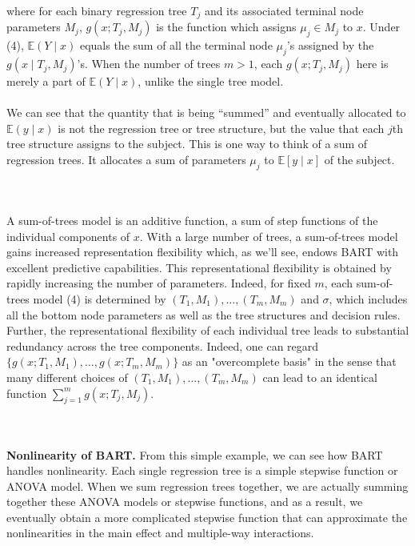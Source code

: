 \documentclass[a4paper,11pt]{article}
\begin{document}
where for each binary regression tree \( T_j \) and its associated terminal node parameters \( M_j \), \( g(x; T_j, M_j) \) is the function which assigns \( \mu_{j} \in M_j \) to \( x \). Under (4), \( \mathbb{E}(Y \mid x) \) equals the sum of all the terminal node \( \mu_{j} \)'s assigned by the \( g(x \mid T_j, M_j) \)'s. When the number of trees \( m > 1 \), each \( g(x; T_j, M_j) \) here is merely a part of \( \mathbb{E}(Y \mid x) \), unlike the single tree model.
\\\\We can see that the quantity that is being ``summed'' and eventually allocated to \( \mathbb{E}(y \mid x) \) is not the regression tree or tree structure, but the value that each \( j \)th tree structure assigns to the subject. This is one way to think of a sum of regression trees. It allocates a sum of parameters \( \mu_{j} \) to \( \mathbb{E}[y \mid x] \) of the subject.

\\\\A sum-of-trees model is an additive function, a sum of step functions of the individual components of \( x \). With a large number of trees, a sum-of-trees model gains increased representation flexibility which, as we'll see, endows BART with excellent predictive capabilities. This representational flexibility is obtained by rapidly increasing the number of parameters. Indeed, for fixed \( m \), each sum-of-trees model (4) is determined by \( (T_1, M_1), \ldots, (T_m, M_m) \) and \( \sigma \), which includes all the bottom node parameters as well as the tree structures and decision rules. Further, the representational flexibility of each individual tree leads to substantial redundancy across the tree components. Indeed, one can regard \( \{g(x; T_1, M_1), \ldots, g(x; T_m, M_m)\} \) as an "overcomplete basis" in the sense that many different choices of \( (T_1, M_1), \ldots, (T_m, M_m) \) can lead to an identical function \( \sum_{j=1}^m g(x; T_j, M_j) \).

\\\\\textbf{Nonlinearity of BART.} From this simple example, we can see how BART handles nonlinearity. Each single regression tree is a simple stepwise function or ANOVA model. When we sum regression trees together, we are actually summing together these ANOVA models or stepwise functions, and as a result, we eventually obtain a more complicated stepwise function that can approximate the nonlinearities in the main effect and multiple-way interactions.
\end{document}
